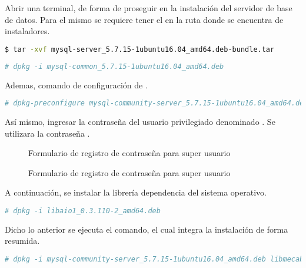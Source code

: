 Abrir una terminal, de forma de proseguir en la instalación del servidor de
base de datos. Para el mismo se requiere tener el  en la
ruta donde se encuentra de instaladores.

\begin{lstlisting}[language=bash, caption={Comando para descomprimir archivos}]
$ tar -xvf mysql-server_5.7.15-1ubuntu16.04_amd64.deb-bundle.tar 
\end{lstlisting}


\begin{lstlisting}[language=bash, caption={Comando para instalar librería}]
# dpkg -i mysql-common_5.7.15-1ubuntu16.04_amd64.deb 
\end{lstlisting}

Ademas, comando de configuración de .

\begin{lstlisting}[language=bash, caption={Comando para configurar servidor de base de datos}]
# dpkg-preconfigure mysql-community-server_5.7.15-1ubuntu16.04_amd64.deb
\end{lstlisting}


Así mismo, ingresar la contraseña del usuario privilegiado denominado 
. Se utilizara la contraseña 
.

\begin{figure}[!ht]
\centering
		\caption{Formulario de registro de contraseña para super usuario}
\end{figure}


\begin{figure}[!ht]
\centering
		\caption{Formulario de registro de contraseña para super usuario}
\end{figure}

A continuación, se instalar la librería dependencia del sistema operativo.

\begin{lstlisting}[language=bash, caption={Comando para instalar librería}]
# dpkg -i libaio1_0.3.110-2_amd64.deb 
\end{lstlisting}


Dicho lo anterior se ejecuta el comando, el cual integra la instalación de forma resumida.

\begin{lstlisting}[language=bash, caption={Comando resumido de instalación de servidor de base de datos}]
# dpkg -i mysql-community-server_5.7.15-1ubuntu16.04_amd64.deb libmecab2_0996-1.2ubuntu1_amd64.deb
\end{lstlisting}


